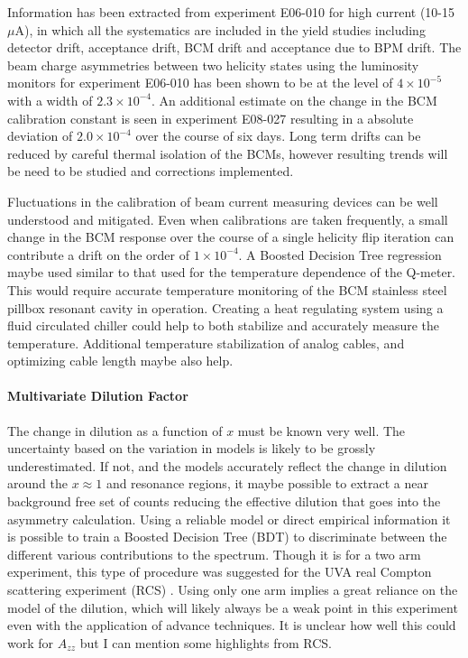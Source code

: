 Information has been extracted from experiment E06-010 for high current (10-15 $\mu$A),
in which all the systematics are included in the yield studies including detector
drift, acceptance drift, BCM drift and acceptance due to BPM drift.
The beam charge asymmetries between two helicity states using the luminosity monitors for experiment E06-010 has been shown to be at the level of $4\times10^{-5}$ with a width of $2.3\times10^{-4}$.  An additional estimate on the change in the BCM calibration
constant is seen in experiment E08-027 resulting in a absolute deviation of $2.0\times10^{-4}$ over the course
of six days.  Long term drifts can be reduced by careful thermal isolation of the BCMs, however resulting trends will be need to be studied and corrections implemented.  

Fluctuations in the calibration of beam current measuring devices can be well understood
and mitigated.  Even when calibrations are taken frequently, a small change in the BCM response over
the course of a single helicity flip iteration can contribute a drift on the order of $1\times10^{-4}$.
A Boosted Decision Tree regression maybe used similar to that used for the temperature dependence
of the Q-meter.  This would require accurate temperature monitoring of the BCM stainless steel pillbox
resonant cavity in operation.  Creating a heat regulating system using a fluid circulated chiller could
help to both stabilize and accurately measure the temperature.  Additional temperature stabilization of analog cables, and optimizing cable length maybe also help.


\iffalse
\paragraph{ Multivariate Dilution Factor }
The change in dilution as a function of $x$ must be known very well.  The uncertainty based
on the variation in models is likely to be grossly underestimated.  If not, and the models
accurately reflect the change in dilution around the $x \approx 1$ and resonance regions, it maybe
possible to extract a near background free set of counts reducing the effective dilution
that goes into the asymmetry calculation.  Using a reliable model or direct empirical information
it is possible to train a Boosted Decision Tree (BDT) to discriminate between the different various
contributions to the spectrum.  Though it is for a two arm experiment, this type of procedure was
suggested for the UVA real Compton scattering experiment (RCS) \cite{Day}.  Using only one arm implies a
great reliance on the model of the dilution, which will likely always be a weak point in this
experiment even with the application of advance techniques.  It is unclear how well this could
work for $A_{zz}$ but I can mention some highlights from RCS.

